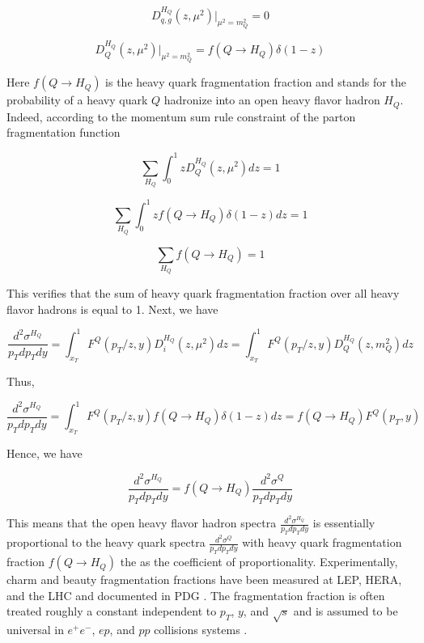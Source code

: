 \begin{equation}
D^{H_Q}_{q,g}(z,\mu^2)|_{\mu^2=m_Q^2} = 0
\end{equation}

\begin{equation}
D^{H_Q}_{Q}(z,\mu^2)|_{\mu^2=m_Q^2} = f(Q \rightarrow H_Q) \delta(1 - z)
\end{equation}

Here $f({Q \rightarrow H_Q})$ is the heavy quark fragmentation fraction and stands for the probability of a heavy quark $Q$ hadronize into an open heavy flavor hadron $H_Q$. Indeed, according to the momentum sum rule constraint of the parton fragmentation function \cite{QCDFFunc}

\begin{equation}
\sum_{H_Q} \int_0^1 z D^{H_Q}_{Q}(z,\mu^2) dz = 1
\end{equation}

\begin{equation}
\sum_{H_Q} \int_0^1 z f(Q \rightarrow H_Q) \delta(1 - z) dz = 1
\end{equation}

\begin{equation}
\sum_{H_Q} f(Q \rightarrow H_Q) = 1 
\end{equation}

This verifies that the sum of heavy quark fragmentation fraction over all heavy flavor hadrons is equal to 1. Next, we have 


\begin{equation}
\frac{d^2\sigma^{H_Q}}{p_T dp_T dy} = \int_{x_T}^1 F^Q(p_T/z, y) D_{i}^{H_Q}(z,\mu^2) dz =  \int_{x_T}^1 F^Q(p_T/z, y) D^{H_Q}_{Q}(z,m_Q^2) dz 
\end{equation}

Thus,

\begin{equation}
\frac{d^2\sigma^{H_Q}}{p_T dp_T dy}  = \int_{x_T}^1 F^Q(p_T/z, y) f(Q \rightarrow H_Q) \delta(1 - z) dz =  f(Q \rightarrow H_Q)  F^Q(p_T, y)
\end{equation}

Hence, we have 

\begin{equation}
\frac{d^2\sigma^{H_Q}}{p_T dp_T dy} = f(Q \rightarrow H_Q) \frac{d^2\sigma^{Q}}{p_T dp_T dy}
\end{equation}

This means that the open heavy flavor hadron spectra $\frac{d^2\sigma^{H_Q}}{p_T dp_T dy}$ is essentially proportional to the heavy quark spectra $\frac{d^2\sigma^{Q}}{p_T dp_T dy}$ with heavy quark fragmentation fraction $f(Q \rightarrow H_Q)$ the as the coefficient of proportionality. Experimentally, charm and beauty fragmentation fractions have been measured at LEP, HERA, and the LHC and documented in PDG \cite{AlphaTheoEx}. The fragmentation fraction is often treated roughly a constant independent to $p_T$, $y$, and $\sqrt s$ and is assumed to be universal in $e^+e^-$, $ep$, and $pp$ collisions systems \cite{AlphaTheoEx}. 

